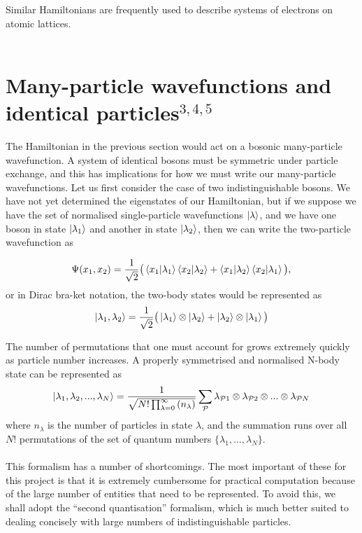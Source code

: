 \documentclass[a4paper,10pt]{article}
\begin{document}
Similar Hamiltonians are frequently used to describe systems of electrons on atomic lattices.
\\\\

\section{Many-particle wavefunctions and identical particles$^{3,4,5}$}
The Hamiltonian in the previous section would act on a bosonic many-particle wavefunction. A system of identical bosons must be symmetric under particle exchange, and this has 
implications for how we must write our many-particle wavefunctions. Let us first consider the case of two indistinguishable bosons. We have not yet determined the eigenstates 
of our Hamiltonian, but if we suppose we have the set of normalised single-particle wavefunctions $\ket{\lambda}$, and we have one boson in state $\ket{\lambda_1}$ and another
in state $\ket{\lambda_2}$, then we can write the two-particle wavefunction as

\begin{equation}
 \Psi(x_1,x_2)=\frac{1}{\sqrt{2}}\big(\braket{x_1|\lambda_1}\braket{x_2|\lambda_2}+\braket{x_1|\lambda_2}\braket{x_2|\lambda_1}\big),
\end{equation}
or in Dirac bra-ket notation, the two-body states would be represented as
\begin{equation}
 \ket{\lambda_1,\lambda_2}=\frac{1}{\sqrt{2}}\big(\ket{\lambda_1}\otimes \ket{\lambda_2}+\ket{\lambda_2}\otimes\ket{\lambda_1}\big)
\end{equation}

The number of permutations that one must account for grows extremely quickly as particle number increases. A properly symmetrised and normalised N-body state can be
represented as 
\begin{equation}
 \ket{\lambda_1,\lambda_2,...,\lambda_N}=\frac{1}{\sqrt{N!\prod_{\lambda=0}^{\infty}{(n_{\lambda})}}}\sum_{\mathcal{P}}\lambda_{\mathcal{P}1}\otimes\lambda_{\mathcal{P}2}\otimes...\otimes\lambda_{\mathcal{P}N}
\end{equation}
where $n_{\lambda}$ is the number of particles in state $\lambda$, and the summation runs over all $N!$ permutations of the set of quantum numbers $\{ \lambda_1,\dots,\lambda_N\}$.
\\\\
This formalism has a number of shortcomings. The most important of these for this project is that it is extremely cumbersome for practical computation because of the large number of entities that need to be 
represented. To avoid this, we shall adopt the ``second quantisation'' formalism, which is much better suited to dealing concisely with large numbers of indistinguishable particles.
\end{document}
